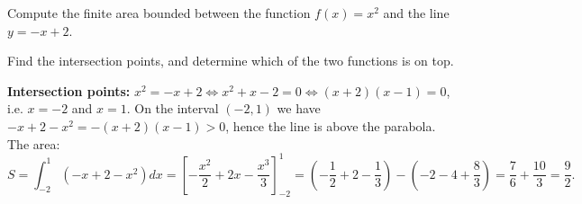 
\begin{question}
Compute the finite area bounded between the function $f(x)=x^2$ and the line $y=-x+2$.
\end{question}

\begin{hint}
Find the intersection points, and determine which of the two functions is on top.
\end{hint}

\begin{solution}
\textbf{Intersection points:} $x^2=-x+2\iff x^2+x-2=0\iff (x+2)(x-1)=0$, i.e. $x=-2$ and $x=1$.
On the interval $(-2,1)$ we have $-x+2-x^2=-(x+2)(x-1)>0$, hence the line is above the parabola. The area:
\[ S=\int_{-2}^{1}\left(-x+2-x^2\right)dx=\left[-\frac{x^2}{2}+2x-\frac{x^3}{3}\right]_{-2}^{1}
=\left(-\frac12+2-\frac13\right)-\left(-2-4+\frac83\right)=\frac76+\frac{10}{3}=\boxed{\frac92}. \]
\end{solution}
